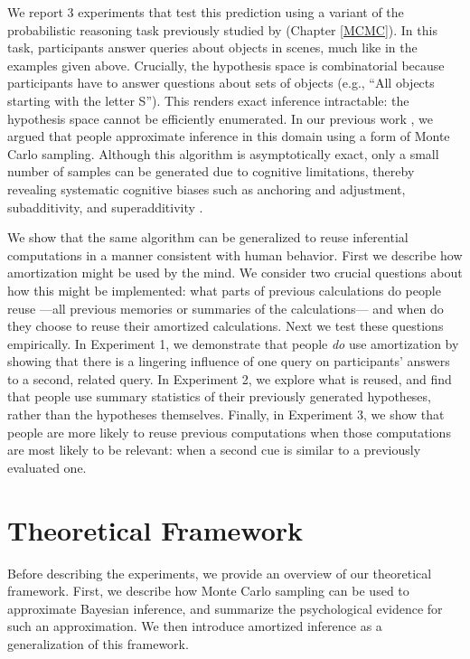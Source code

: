 We report 3 experiments that test this prediction using a variant of the probabilistic reasoning task previously studied by \citet{dasgupta2017hypotheses} (Chapter \ref{MCMC}). In this task, participants answer queries about objects in scenes, much like in the examples given above. Crucially, the hypothesis space is combinatorial because participants have to answer questions about sets of objects (e.g., ``All objects starting with the letter S''). This renders exact inference intractable: the hypothesis space cannot be efficiently enumerated. In our previous work \citep{dasgupta2017hypotheses}, we argued that people approximate inference in this domain using a form of Monte Carlo sampling. Although this algorithm is asymptotically exact, only a small number of samples can be generated due to cognitive limitations, thereby revealing systematic cognitive biases such as anchoring and adjustment, subadditivity, and superadditivity \citep{lieder2017empirical,lieder2017anchoring,vul2014one}.

We show that the same algorithm can be generalized to reuse inferential computations in a manner consistent with human behavior. First we describe how amortization might be used by the mind. We consider two crucial questions about how this might be implemented: what parts of previous calculations do people reuse ---all previous memories or summaries of the calculations--- and when do they choose to reuse their amortized calculations. Next we test these questions empirically. In Experiment 1, we demonstrate that people \emph{do} use amortization by showing that there is a lingering influence of one query on participants' answers to a second, related query. In Experiment 2, we explore what is reused, and find that people use summary statistics of their previously generated hypotheses, rather than the hypotheses themselves. Finally, in Experiment 3, we show that people are more likely to reuse previous computations when those computations are most likely to be relevant: when a second cue is similar to a previously evaluated one.

\section{Theoretical Framework}

Before describing the experiments, we provide an overview of our theoretical framework. First, we describe how Monte Carlo sampling can be used to approximate Bayesian inference, and summarize the psychological evidence for such an approximation. We then introduce amortized inference as a generalization of this framework.

